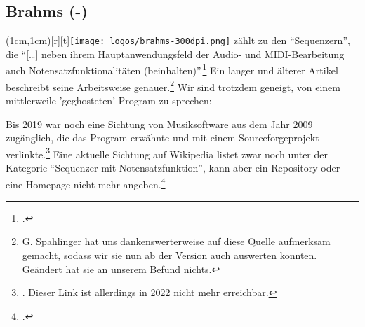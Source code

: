 %
%
%



\subsection{Brahms (-)}

\parpic(1cm,1cm)[r][t]{\texttt{[image: logos/brahms-300dpi.png]}}
\label{Brahms} zählt  zu den \enquote{Sequenzern},
die \enquote{[\ldots] neben ihrem Hauptanwendungsfeld der Audio- und
MIDI-Bearbeitung auch Notensatzfunktionalitäten
(beinhalten)}.\footcite[vgl.][\nopage wp.]{WpedNotensatz2019a} Ein langer und älterer Artikel beschreibt seine Arbeitsweise genauer.\footnote{\cite[vgl.][\nopage wp.]{Wuerthner2002a} G. Spahlinger hat uns dankenswerterweise auf diese Quelle aufmerksam gemacht, sodass wir sie nun ab der Version  auch auswerten konnten. Geändert hat sie an unserem Befund nichts. } Wir sind trotzdem geneigt, von einem mittlerweile 'geghosteten' Program zu sprechen:

Bis 2019 war noch eine Sichtung von Musiksoftware aus dem Jahr 2009 zugänglich, die das Program  erwähnte und mit einem Sourceforgeprojekt verlinkte.\footnote{\cite[vgl.][\nopage wp.]{Callon2009a}. Dieser Link ist allerdings in 2022 nicht mehr erreichbar.} Eine aktuelle Sichtung auf Wikipedia listet  zwar noch unter der Kategorie \enquote{Sequenzer mit Notensatzfunktion}, kann aber ein Repository oder eine Homepage nicht mehr angeben.\footcite[vgl.][\nopage wp.]{WpedNotensatz2019a}

